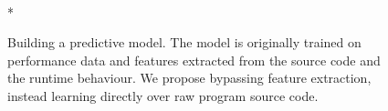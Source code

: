 \begin{figure}[t!]
  \centering
  \\*%
  \caption[Building a predictive model]{%
    Building a predictive model. The model is originally trained on performance
    data and features extracted from the source code and the runtime behaviour.
    We propose bypassing feature extraction, instead learning directly over raw
    program source code.%
  }%
  \label{fig:overview}
\end{figure}
